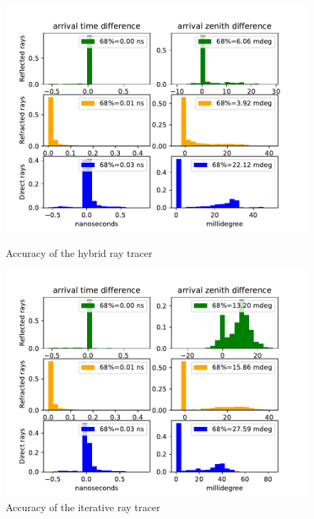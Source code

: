 \begin{figure}
	\centering
\begin{minipage}{0.49\textwidth}
	\includegraphics[width=1.1\textwidth]{figures/hybrid_comparison_N_1000.pdf}
	\caption{Accuracy of the hybrid ray tracer}
	\label{fig:acchyb}
\end{minipage}
\begin{minipage}{0.49\textwidth}
	\includegraphics[width=1.1\textwidth]{figures/iterative_comparison_N_1000.pdf}
	\caption{Accuracy of the iterative ray tracer}
	\label{fig:accit}
\end{minipage}
\end{figure}



